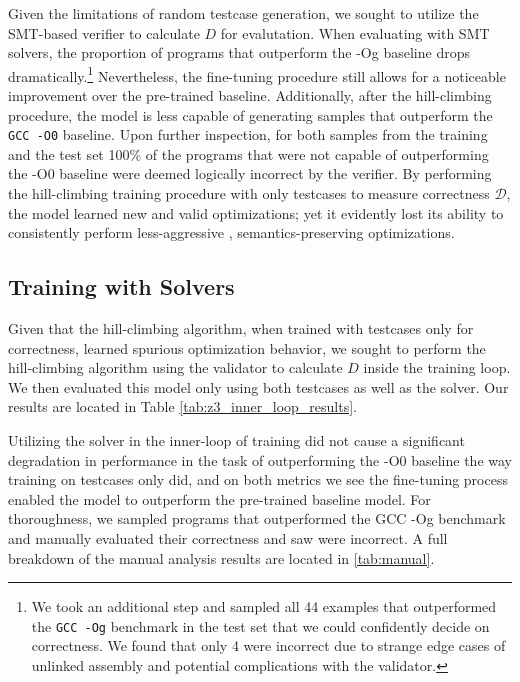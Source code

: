 \documentclass{article}
\begin{document}
Given the limitations of random testcase generation, we sought to utilize the SMT-based verifier to calculate $D$ for evalutation. When evaluating with SMT solvers, the proportion of programs that outperform the -Og baseline drops dramatically.\footnote{We took an additional step and sampled all 44 examples that outperformed the \texttt{GCC -Og} benchmark in the test set that we could confidently decide on correctness. We found that only 4 were incorrect due to strange edge cases of unlinked assembly and potential complications with the validator.} Nevertheless, the fine-tuning procedure still allows for a noticeable improvement over the pre-trained baseline. Additionally, after the hill-climbing procedure, the model is less capable of generating samples that outperform the \texttt{GCC -O0} baseline. Upon further inspection, for both samples from the training and the test set 100\% of the programs that were not capable of outperforming the -O0 baseline were deemed logically incorrect by the verifier. By performing the hill-climbing training procedure with only testcases to measure correctness $\mathcal{D}$, the model learned new and valid optimizations; yet it evidently lost its ability to consistently perform less-aggressive , semantics-preserving optimizations. 

\subsection{Training with Solvers}


Given that the hill-climbing algorithm, when trained with testcases only for correctness, learned spurious optimization behavior, we sought to perform the hill-climbing algorithm using the validator to calculate $D$ inside the training loop. We then evaluated this model only using both testcases as well as the solver. Our results are located in Table \ref{tab:z3_inner_loop_results}. 

Utilizing the solver in the inner-loop of training did not cause a significant degradation in performance in the task of outperforming the -O0 baseline the way training on testcases only did, and on both metrics we see the fine-tuning process enabled the model to outperform the pre-trained baseline model. For thoroughness, we sampled  programs that outperformed the GCC -Og benchmark and manually evaluated their correctness and saw  were incorrect. A full breakdown of the manual analysis results are located in \ref{tab:manual}.
\end{document}
